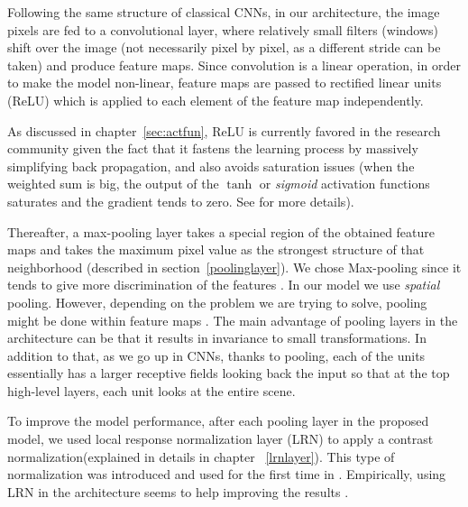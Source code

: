 Following the same structure of classical CNNs, in our architecture, the image pixels are fed to a convolutional layer, where relatively small filters (windows) shift over the image (not necessarily pixel by pixel, as a different stride can be taken) and produce feature maps. Since convolution is a linear operation, in order to make the model non-linear, feature maps are passed to rectified linear units (ReLU) \cite{nair2010rectified} which is applied to each element of the feature map independently. 

As discussed in chapter~\ref{sec:actfun}, ReLU is currently favored in the research community given the fact that it fastens the learning process by massively simplifying back propagation, and also avoids saturation issues (when the weighted sum is big, the output of the $\tanh$ or \textit{sigmoid} activation functions saturates and the gradient tends to zero. See \cite{hansen1990neural, amit1987statistical} for more details). 

\indent Thereafter, a max-pooling layer takes a special region of the obtained feature maps and takes the maximum pixel value as the strongest structure of that neighborhood (described in section~\ref{poolinglayer}). We chose Max-pooling since it tends to give more discrimination of the features \cite{boureau2010theoretical}. In our model we use \textit{spatial} pooling. However, depending on the problem we are trying to solve, pooling might be done within feature maps \cite{goodfellow2013maxout}. The main advantage of pooling layers in the architecture can be that it results in invariance to small transformations. In addition to that, as we go up in CNNs, thanks to pooling, each of the units essentially has a larger receptive fields looking back the input so that at the top high-level layers, each unit looks at the entire scene.  

To improve the model performance, after each pooling layer in the proposed model, we used local response normalization layer (LRN) to apply a contrast normalization(explained in details in chapter ~\ref{lrnlayer}). This type of normalization was introduced and used for the first time in \cite{krizhevsky2012imagenet}. Empirically, using LRN in the architecture seems to help improving the results \cite{jarrett2009best, krizhevsky2012imagenet}. 


